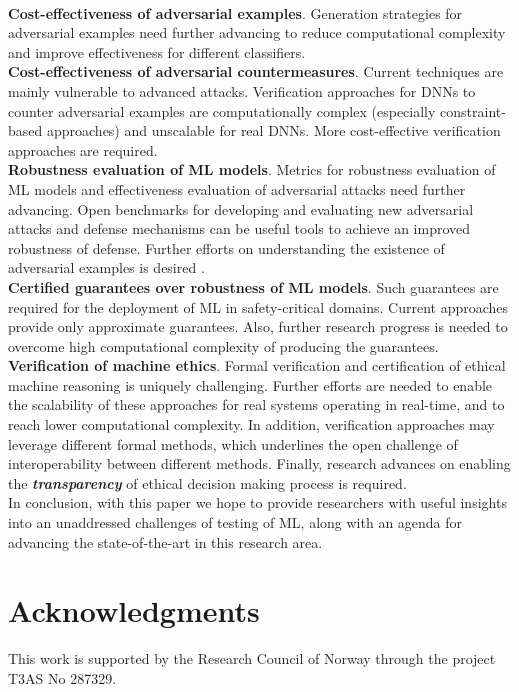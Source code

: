 \documentclass[letterpaper]{article} %
\begin{document}
\vspace{3pt}\\
\noindent \textbf{Cost-effectiveness of adversarial examples}. Generation strategies for adversarial examples need further advancing to reduce computational complexity and improve effectiveness for different classifiers. 
\vspace{3pt}\\ 
\noindent \textbf{Cost-effectiveness of adversarial countermeasures}. Current techniques are mainly vulnerable to advanced attacks. Verification approaches for DNNs to counter adversarial examples are computationally complex (especially constraint-based approaches) and unscalable for real DNNs. More cost-effective verification approaches are required.
\vspace{3pt}\\
\noindent \textbf{Robustness evaluation of ML models}. Metrics for robustness evaluation of ML models and effectiveness evaluation of adversarial attacks need further advancing. Open benchmarks for developing and evaluating new adversarial attacks and defense mechanisms can be useful tools to achieve an improved robustness of defense. Further efforts on understanding the existence of adversarial examples is desired \cite{Yuan2019}.
\vspace{3pt}\\
\noindent \textbf{Certified guarantees over robustness of ML models}. Such guarantees are required for the deployment of ML in safety-critical domains. Current approaches provide only approximate guarantees. Also, further research progress is needed to overcome high computational complexity of producing the guarantees.
\vspace{3pt}\\
\noindent \textbf{Verification of machine ethics}. Formal verification and certification of ethical machine reasoning is uniquely challenging. Further efforts are needed to enable the scalability of these approaches for real systems operating in real-time, and to reach lower computational complexity. In addition, verification approaches may leverage different formal methods, which underlines the open challenge of interoperability between different methods. Finally, research advances on enabling the \textit{\textbf{transparency}} of ethical decision making process is required.
\vspace{5pt}\\
In conclusion, with this paper we hope to provide researchers with useful insights into an unaddressed challenges of testing of ML, along with an agenda for advancing the state-of-the-art in this research area.

\section{ Acknowledgments}
This work is supported by the Research Council of Norway through the project T3AS No 287329.

\fontsize{9.5pt}{10.5pt}
\selectfont 



\end{document}
